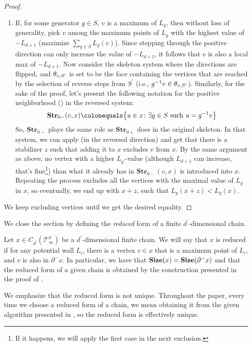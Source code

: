 \begin{proof}
\begin{enumerate}
      \item If, for some generator $g \in S$, $v$ is a maximum of $L_{g}$, then without loss of generality, pick $v$ among the maximum points of $L_{g}$ with the highest value of $-L_{d+1}$ (maximize $\sum_{g \in S} L_{g}(v)$). Since stepping through the positive direction can only increase the value of $-L_{d+1}$, it follows that $v$ is also a local max of $-L_{d+1}$.
        Now consider the skeleton system where the directions are flipped, and $\theta_{v ,S^{\prime}}{}$ is set to be the face containing the vertices that are reached by the selection of reverse steps from $S^{\prime}$ (i.e., $g^{-1}v \in \theta_{v ,S^{\prime}}{}$). Similarly, for the sake of the proof, let's present the following notation for the positive neighborhood () in the reversed system:
        \begin{equation*}
          \begin{split}
            \textbf{Str}_{0-}(v,x) \colonequals \big\{ u \in x \colon \exists g \in S \text{ such }  u = g^{-1}v   \big\}
          \end{split}
        \end{equation*}
So, $\textbf{Str}_{0-}$ plays the same role as $\textbf{Str}_{0+}$ does in the original skeleton.
        In that system, we can apply  (in the reversed direction) and get that there is a stabilizer $z$ such that adding it to $x$ excludes $v$ from $x$. By the same argument as above, no vertex with a higher $L_{g^{\prime}}$-value (although $L_{d+1}$ can increase, that's fine\footnote{If it happens, we will apply the first case in the next exclusion.}) than what it already has in $\textbf{Str}_{0-}(v,x)$ is introduced into $x$. Repeating the process excludes all the vertices with the maximal value of $L_{g}$ in $x$, so eventually, we end up with $x+z$, such that $L_{g}(x+z) < L_{g}(x)$.
  \end{enumerate}

  
We keep excluding vertices until we get the desired equality.

\end{proof}





We close the section by defining the \textit{reduced} form of a finite $d^{\prime}$-dimensional chain. 
\begin{definition}
  \label{def:reduced}
Let $x \in C_{d^{\prime}}(\mathcal T_\infty^d)$ be a $d^{\prime}$-dimensional finite chain. We will say that $x$ is reduced if for any potential wall $L_{i}$, there is a vertex $v \in x$ that is a maximum point of $L_{i}$, and $v$ is also in $\partial^{-} x$.
  In particular, we have that $\mathbf{Size}(x) = \mathbf{Size}(\partial^{-} x)$ and that the reduced form of a given chain is obtained by the construction presented in the proof of . 
\end{definition}
We emphasize that the reduced form is not unique. Throughout the paper, every time we choose a reduced form of a chain, we mean obtaining it from the given algorithm presented in , so the reduced form is effectively unique.


 















